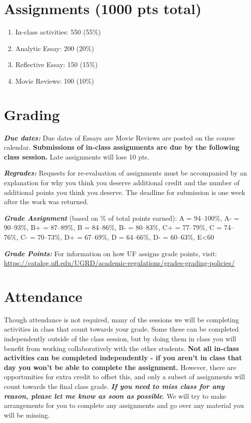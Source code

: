\documentclass[
  12pt,
  letterpaper,
  DIV=11,
  numbers=noendperiod]{scrreprt}
\providecommand{\tightlist}{%
  \setlength{\itemsep}{0pt}\setlength{\parskip}{0pt}}
\begin{document}
\section*{Assignments (1000 pts
total)}\label{assignments-1000-pts-total}

\begin{enumerate}
\def\labelenumi{\arabic{enumi})}
\tightlist
\item
  In-class activities: 550 (55\%)
\item
  Analytic Essay: 200 (20\%)
\item
  Reflective Essay: 150 (15\%)
\item
  Movie Reviews: 100 (10\%)
\end{enumerate}

\section*{Grading}\label{grading}

\textbf{\emph{Due dates:}} Due dates of Essays are Movie Reviews are
posted on the course calendar. \textbf{Submissions of in-class
assignments are due by the following class session.} Late assignments
will lose 10 pts.

\textbf{\emph{Regrades:}} Requests for re-evaluation of assignments must
be accompanied by an explanation for why you think you deserve
additional credit and the number of additional points you think you
deserve. The deadline for submission is one week after the work was
returned.

\textbf{\emph{Grade Assignment}} (based on \% of total points earned): A
= 94--100\%, A- = 90--93\%, B+ = 87--89\%, B = 84--86\%, B- = 80--83\%,
C+ = 77--79\%, C = 74--76\%, C- = 70--73\%, D+ = 67--69\%, D = 64--66\%,
D- = 60--63\%, E\textless60

\textbf{\emph{Grade Points:}} For information on how UF assigns grade
points, visit:
\url{https://catalog.ufl.edu/UGRD/academic-regulations/grades-grading-policies/}

\section*{Attendance}\label{attendance}

Though attendance is not required, many of the sessions we will be
completing activities in class that count towards your grade. Some these
can be completed independently outside of the class session, but by
doing them in class you will benefit from working collaboratively with
the other students. \textbf{Not all in-class activities can be completed
independently - if you aren't in class that day you won't be able to
complete the assignment.} However, there are opportunities for extra
credit to offset this, and only a subset of assignments will count
towards the final class grade. \textbf{\emph{If you need to miss class
for any reason, please let me know as soon as possible}}. We will try to
make arrangements for you to complete any assignments and go over any
material you will be missing.
\end{document}
